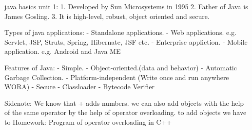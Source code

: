 java basics unit 1:
  1. Developed by Sun Microsystems in 1995
  2. Father of Java is James Gosling.
  3. It is high-level, robust, object oriented and secure. 

Types of java applications:
  - Standalone applications. 
  - Web applications. e.g. Servlet, JSP, Struts, Spring, Hibernate, JSF etc.
  - Enterprise appliction. 
  - Mobile application. e.g. Android and Java ME

Features of Java:
  - Simple.
  - Object-oriented.(data and behavior)
  - Automatic Garbage Collection.
  - Platform-independent (Write once and run anywhere WORA)
  - Secure 
  - Classloader
  - Bytecode Verifier

Sidenote: We know that + adds numbers. we can also add objects with the help of the same operator by the help of operator overloading. to add objects we have to 
Homework: Program of operator overloading in C++
